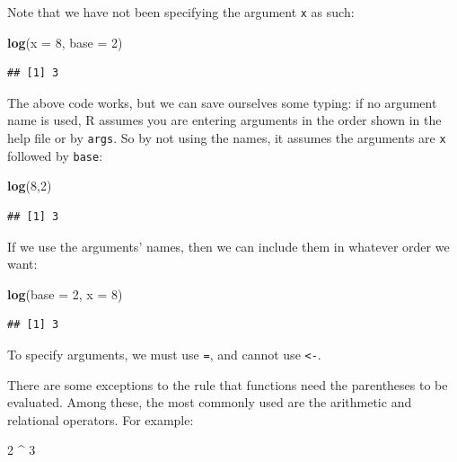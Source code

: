 \documentclass[
]{article}
\newenvironment{Shaded}{\begin{snugshade}}{\end{snugshade}}
\newcommand{\AttributeTok}[1]{\textcolor[rgb]{0.13,0.29,0.53}{#1}}
\newcommand{\DecValTok}[1]{\textcolor[rgb]{0.00,0.00,0.81}{#1}}
\newcommand{\FunctionTok}[1]{\textcolor[rgb]{0.13,0.29,0.53}{\textbf{#1}}}
\newcommand{\NormalTok}[1]{#1}
\newcommand{\SpecialCharTok}[1]{\textcolor[rgb]{0.81,0.36,0.00}{\textbf{#1}}}
\begin{document}
Note that we have not been specifying the argument \texttt{x} as such:

\begin{Shaded}
\begin{Highlighting}[]
\FunctionTok{log}\NormalTok{(}\AttributeTok{x =} \DecValTok{8}\NormalTok{, }\AttributeTok{base =} \DecValTok{2}\NormalTok{)}
\end{Highlighting}
\end{Shaded}

\begin{verbatim}
## [1] 3
\end{verbatim}

The above code works, but we can save ourselves some typing: if no
argument name is used, R assumes you are entering arguments in the order
shown in the help file or by \texttt{args}. So by not using the names,
it assumes the arguments are \texttt{x} followed by \texttt{base}:

\begin{Shaded}
\begin{Highlighting}[]
\FunctionTok{log}\NormalTok{(}\DecValTok{8}\NormalTok{,}\DecValTok{2}\NormalTok{)}
\end{Highlighting}
\end{Shaded}

\begin{verbatim}
## [1] 3
\end{verbatim}

If we use the arguments' names, then we can include them in whatever
order we want:

\begin{Shaded}
\begin{Highlighting}[]
\FunctionTok{log}\NormalTok{(}\AttributeTok{base =} \DecValTok{2}\NormalTok{, }\AttributeTok{x =} \DecValTok{8}\NormalTok{)}
\end{Highlighting}
\end{Shaded}

\begin{verbatim}
## [1] 3
\end{verbatim}

To specify arguments, we must use \texttt{=}, and cannot use
\texttt{\textless{}-}.

There are some exceptions to the rule that functions need the
parentheses to be evaluated. Among these, the most commonly used are the
arithmetic and relational operators. For example:

\begin{Shaded}
\begin{Highlighting}[]
\DecValTok{2} \SpecialCharTok{\^{}} \DecValTok{3}
\end{Highlighting}
\end{Shaded}
\end{document}
